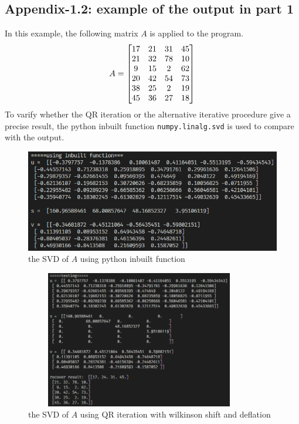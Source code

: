 \subsection{Appendix-1.2: example of the output in part 1}
In this example, the following matrix $A$ is applied to the program. 
\begin{equation}\notag
    A = \left[\begin{matrix}
        17 & 21 & 31 & 45 \\
        21 & 32 & 78 & 10 \\
        9 & 15 & 2 & 62 \\
        20 & 42 & 54 & 73 \\
        38 & 25 & 2 & 19 \\
        45 & 36 & 27 & 18 \\
    \end{matrix}\right]
\end{equation}
To varify whether the QR iteration or the alternative iterative procedure give a precise result, the python inbuilt function \lstinline{numpy.linalg.svd} is used to compare with the output. 

\begin{figure}[H]
\centering
\includegraphics{Example_result_inbuilt.png}
\caption{the SVD of $A$ using python inbuilt function}
\end{figure}

\begin{figure}[H]
    \centering
    \includegraphics[height=60mm, width=100mm]{Example_result_testing.png}
    \caption{the SVD of $A$ using QR iteration with wilkinson shift and deflation}
\end{figure}

